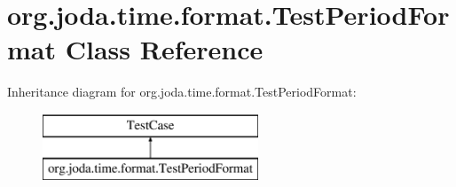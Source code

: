 \hypertarget{classorg_1_1joda_1_1time_1_1format_1_1_test_period_format}{\section{org.\-joda.\-time.\-format.\-Test\-Period\-Format Class Reference}
\label{classorg_1_1joda_1_1time_1_1format_1_1_test_period_format}
}
Inheritance diagram for org.\-joda.\-time.\-format.\-Test\-Period\-Format\-:\begin{figure}[H]
\begin{center}
\leavevmode
\includegraphics[height=2.000000cm]{classorg_1_1joda_1_1time_1_1format_1_1_test_period_format}
\end{center}
\end{figure}
